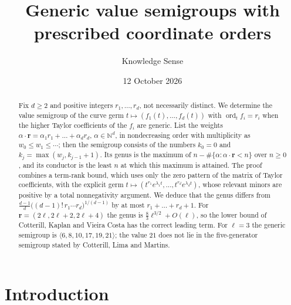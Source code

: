\documentclass{amsart}
\theoremstyle{definition}
\numberwithin{equation}{section}
\newcommand{\N}{\mathbb{N}}
\newcommand{\ord}{\operatorname{ord}}
\newcommand{\gen}[1]{\langle #1\rangle}
\begin{document}
\title[Generic value semigroups]{Generic value semigroups with prescribed coordinate orders}

\author{Knowledge Sense}

\date{12 October 2026}



\begin{abstract}
Fix $d\ge 2$ and positive integers $r_1,\dots,r_d$, not necessarily distinct.
We determine the value semigroup of the curve germ
$t\mapsto(f_1(t),\dots,f_d(t))$ with $\ord_t f_i=r_i$ when the higher Taylor
coefficients of the $f_i$ are generic. List the weights
$\alpha\cdot\mathbf{r}=\alpha_1r_1+\dots+\alpha_dr_d$, $\alpha\in\N^d$, in
nondecreasing order with multiplicity as $w_0\le w_1\le\cdots$; then the
semigroup consists of the numbers $k_0=0$ and $k_j=\max(w_j,k_{j-1}+1)$. Its
genus is the maximum of $n-\#\{\alpha:\alpha\cdot\mathbf{r}<n\}$ over $n\ge0$,
and its conductor is the least $n$ at which this maximum is attained. The proof
combines a term-rank bound, which uses only the zero pattern of the matrix of
Taylor coefficients, with the explicit germ
$t\mapsto(t^{r_1}e^{\lambda_1t},\dots,t^{r_d}e^{\lambda_dt})$, whose relevant
minors are positive by a total nonnegativity argument. We deduce that the genus
differs from $\frac{d-1}{d}\bigl((d-1)!\,r_1\cdots r_d\bigr)^{1/(d-1)}$ by at
most $r_1+\dots+r_d+1$. For $\mathbf{r}=(2\ell,2\ell+2,2\ell+4)$ the genus is
$\frac83\ell^{3/2}+O(\ell)$, so the lower bound of Cotterill, Kaplan and Vieira
Costa has the correct leading term. For $\ell=3$ the generic semigroup is
$\gen{6,8,10,17,19,21}$; the value $21$ does not lie in the five-generator
semigroup stated by Cotterill, Lima and Martins.
\end{abstract}

\maketitle

\section{Introduction}
\end{document}
